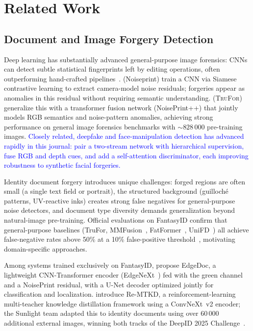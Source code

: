 \documentclass[final,5p,times,twocolumn,number]{elsarticle}
\newcommand{\revB}[1]{\textcolor{blue}{#1}}
\begin{document}

\section{Related Work}
\label{sec:related}

\subsection{Document and Image Forgery Detection}

Deep learning has substantially advanced general-purpose image forensics:
CNNs can detect subtle statistical fingerprints left by editing operations,
often outperforming hand-crafted pipelines~\citep{mantranet2019}.
\citet{cozzolino2020noiseprint} (Noiseprint) train a CNN via Siamese
contrastive learning to extract camera-model noise residuals; forgeries appear
as anomalies in this residual without requiring semantic understanding.
\citet{trufor2023} (\textsc{TruFor}) generalize this with a transformer fusion
network (NoisePrint++) that jointly models RGB semantics and noise-pattern
anomalies, achieving strong performance on general image forensics benchmarks
with ${\sim}828\,000$ pre-training images. \revB{Closely related, deepfake and
face-manipulation detection has advanced rapidly in this journal:
\citet{liang2023twostream} pair a two-stream network with hierarchical
supervision, \citet{leporoni2024guided} fuse {RGB} and depth cues, and
\citet{wang2024deepfake} add a self-attention discriminator, each improving
robustness to synthetic facial forgeries.}

Identity document forgery introduces unique challenges: forged regions are
often small (a single text field or portrait), the structured background
(guilloché patterns, UV-reactive inks) creates strong false negatives for
general-purpose noise detectors, and document type diversity demands
generalization beyond natural-image pre-training. Official evaluations on
FantasyID confirm that general-purpose baselines (TruFor, MMFusion~\citep{mmfusion2024},
FatFormer~\citep{fatformer2024}, UniFD~\citep{unifd2023}) all achieve
false-negative rates above 50\% at a 10\% false-positive
threshold~\citep{fantasyid2024}, motivating domain-specific approaches.

Among systems trained exclusively on FantasyID, \citet{edgedoc2025} propose
EdgeDoc, a lightweight CNN-Transformer encoder (EdgeNeXt~\citep{edgenext2022}) fed with the green
channel and a NoisePrint residual, with a U-Net decoder optimized jointly for
classification and localization. \citet{remtkd2025} introduce Re-MTKD, a
reinforcement-learning multi-teacher knowledge distillation framework using a
ConvNeXt~v2 encoder; the Sunlight team adapted this to identity documents using
over 60\,000 additional external images, winning both tracks of the DeepID
2025 Challenge~\citep{deepid2025challenge}.
\end{document}

